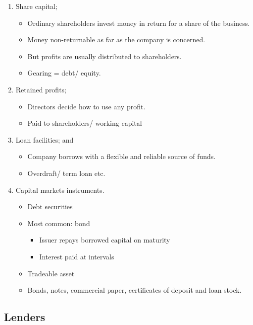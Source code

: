 \documentclass[
]{article}
\providecommand{\tightlist}{%
  \setlength{\itemsep}{0pt}\setlength{\parskip}{0pt}}
\begin{document}
\begin{enumerate}
\tightlist
\item
  Share capital;

  \begin{itemize}
  \tightlist
  \item
    Ordinary shareholders invest money in return for a share of the
    business.
  \item
    Money non-returnable as far as the company is concerned.
  \item
    But profits are usually distributed to shareholders.
  \item
    Gearing = debt/ equity.
  \end{itemize}
\item
  Retained profits;

  \begin{itemize}
  \tightlist
  \item
    Directors decide how to use any profit.
  \item
    Paid to shareholders/ working capital
  \end{itemize}
\item
  Loan facilities; and

  \begin{itemize}
  \tightlist
  \item
    Company borrows with a flexible and reliable source of funds.
  \item
    Overdraft/ term loan etc.
  \end{itemize}
\item
  Capital markets instruments.

  \begin{itemize}
  \tightlist
  \item
    Debt securities
  \item
    Most common: bond

    \begin{itemize}
    \tightlist
    \item
      Issuer repays borrowed capital on maturity
    \item
      Interest paid at intervals
    \end{itemize}
  \item
    Tradeable asset
  \item
    Bonds, notes, commercial paper, certificates of deposit and loan
    stock.
  \end{itemize}
\end{enumerate}

\hypertarget{lenders}{%
\subsection{Lenders}\label{lenders}}
\end{document}
